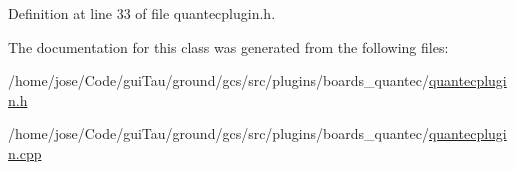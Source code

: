 Definition at line 33 of file quantecplugin.\-h.



The documentation for this class was generated from the following files\-:\begin{DoxyCompactItemize}
\item 
/home/jose/\-Code/gui\-Tau/ground/gcs/src/plugins/boards\-\_\-quantec/\hyperlink{quantecplugin_8h}{quantecplugin.\-h}\item 
/home/jose/\-Code/gui\-Tau/ground/gcs/src/plugins/boards\-\_\-quantec/\hyperlink{quantecplugin_8cpp}{quantecplugin.\-cpp}\end{DoxyCompactItemize}
